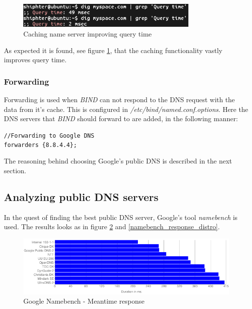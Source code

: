 \begin{figure}[ht!]
\centering
\includegraphics[width=90mm]{img/dig_caching_querytime.png}
\caption{Caching name server improving query time}
\label{dig_caching_querytime}
\end{figure}

As expected it is found, see figure \ref{dig_caching_querytime}, that the caching functionality vastly improves query time.

\subsubsection{Forwarding} 
Forwarding is used when \emph{BIND} can not respond to the DNS request with the data from it's cache. This is configured in \emph{/etc/bind/named.conf.options}. Here the DNS servers that \emph{BIND} should forward to are added, in the following manner:

\texttt{//Forwarding to Google DNS} \\
\texttt{forwarders \{8.8.4.4\};}

The reasoning behind choosing Google's public DNS is described in the next section.

\subsection{Analyzing public DNS servers}
In the quest of finding the best public DNS server, Google's tool \emph{namebench} is used. The results looks as in figure \ref{namebench_meantime_response_chart} and \ref{namebench_response_distro}.


\begin{figure}[H]
\centering
\includegraphics[width=150mm]{img/namebench_meantime_response_chart.png}
\caption{Google Namebench - Meantime response}
\label{namebench_meantime_response_chart}
\end{figure}

